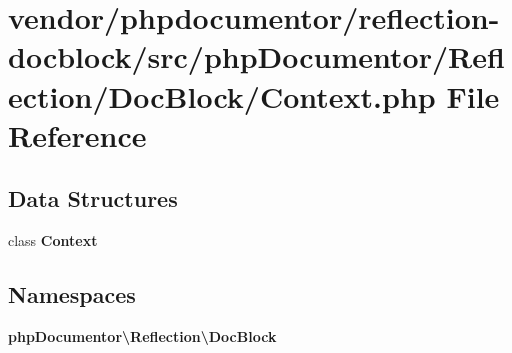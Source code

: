 \section{vendor/phpdocumentor/reflection-\/docblock/src/php\+Documentor/\+Reflection/\+Doc\+Block/\+Context.php File Reference}
\label{phpdocumentor_2reflection-docblock_2src_2php_documentor_2_reflection_2_doc_block_2_context_8php}
\subsection*{Data Structures}
\begin{DoxyCompactItemize}
\item 
class {\bf Context}
\end{DoxyCompactItemize}
\subsection*{Namespaces}
\begin{DoxyCompactItemize}
\item 
 {\bf php\+Documentor\textbackslash{}\+Reflection\textbackslash{}\+Doc\+Block}
\end{DoxyCompactItemize}
